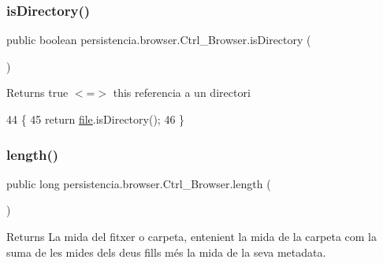 \subsubsection{\texorpdfstring{is\+Directory()}{isDirectory()}}
{\footnotesize\ttfamily public boolean persistencia.\+browser.\+Ctrl\+\_\+\+Browser.\+is\+Directory (\begin{DoxyParamCaption}{ }\end{DoxyParamCaption})\hspace{0.3cm}{\ttfamily [inline]}}

\begin{DoxyReturn}{Returns}
true $<$=$>$ this referencia a un directori 
\end{DoxyReturn}

\begin{DoxyCode}
44                                  \{
45         \textcolor{keywordflow}{return} \hyperlink{classpersistencia_1_1browser_1_1Ctrl__Browser_a72c151aed575c0848f7dbb1609b373c8}{file}.isDirectory();
46     \}
\end{DoxyCode}
\mbox{\label{classpersistencia_1_1browser_1_1Ctrl__Browser_a22b50558c4e066fe0e486def502bd30d}} 
\subsubsection{\texorpdfstring{length()}{length()}}
{\footnotesize\ttfamily public long persistencia.\+browser.\+Ctrl\+\_\+\+Browser.\+length (\begin{DoxyParamCaption}{ }\end{DoxyParamCaption})\hspace{0.3cm}{\ttfamily [inline]}}

\begin{DoxyReturn}{Returns}
La mida del fitxer o carpeta, entenient la mida de la carpeta com la suma de les mides dels deus fills més la mida de la seva metadata. 
\end{DoxyReturn}

